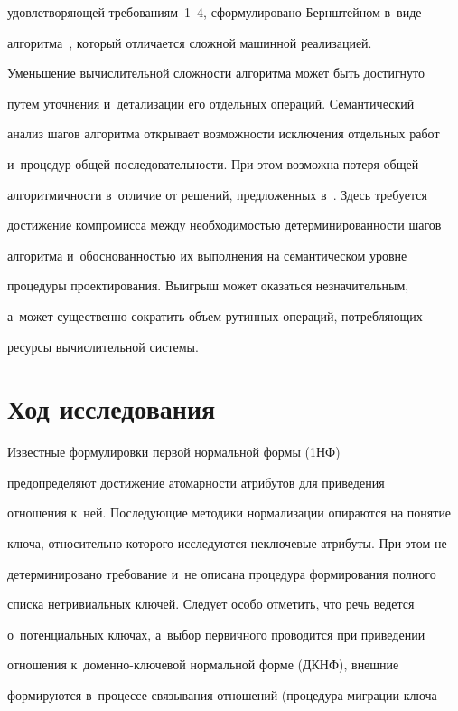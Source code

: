 удовлетворяющей требованиям~1--4, сформулировано Бернштейном в~виде 

алгоритма~\cite{17-iv}, который отличается сложной машинной реализацией. 

Уменьшение вычислительной сложности алгоритма может быть достигнуто 

путем уточнения и~детализации его отдельных операций. Семантический 

анализ шагов алгоритма открывает возможности исключения отдельных работ 

и~процедур общей последовательности. При этом возможна потеря общей 

алгоритмичности в~отличие от решений, предложенных в~\cite{16-iv}. Здесь требуется 

достижение компромисса между необходимостью детерминированности шагов 

алгоритма и~обоснованностью их выполнения на семантическом уровне 

процедуры проектирования. Выигрыш может оказаться незначительным, 

а~может существенно сократить объем рутинных операций, потребляющих 

ресурсы вычислительной сис\-темы.



\section{Ход исследования}

  

  Известные формулировки первой нормальной формы (1НФ)~\cite{9-iv, 13-iv} 

пред\-опре\-де\-ля\-ют достижение атомарности атрибутов для приведения 

отношения к~ней. Последующие методики нормализации опираются на понятие 

ключа, относительно которого исследуются неключевые атрибуты. При этом не 

детерминировано требование и~не описана процедура формирования полного 

списка нетривиальных ключей. Следует особо отметить, что речь ведется 

о~потенциальных ключах, а~выбор первичного проводится при приведении 

отношения к~до\-мен\-но-клю\-че\-вой нормальной форме (ДКНФ), внешние 

формируются в~процессе связывания отношений (процедура миграции ключа 

